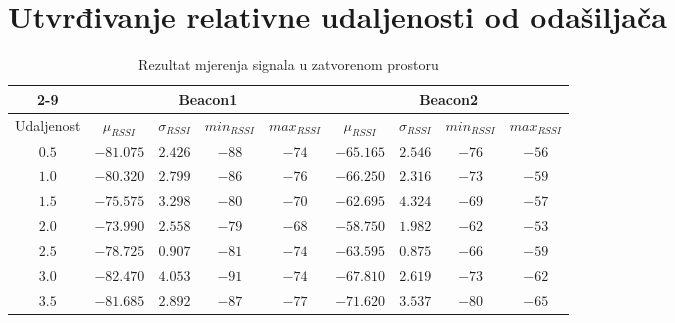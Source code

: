 \section*{Utvrđivanje relativne udaljenosti od odašiljača}

\begin{table}[H]
    \centering
    \caption{Rezultat mjerenja signala u zatvorenom prostoru}
    \label{tbl:indoor}
	\begin{tabular}{|c|cccc||cccc|}%
	\cline{2-9}
	\multicolumn{1}{!{\vrule width 0pt}c!{\vrule width 1pt}}{} & \multicolumn{4}{c||}{Beacon1} & \multicolumn{4}{c|}{Beacon2} \\ %
	\hline 
	Udaljenost & $\mu_{RSSI}$ & $\sigma_{RSSI}$ & $min_{RSSI}$ & $max_{RSSI}$ & $\mu_{RSSI}$ & $\sigma_{RSSI}$ & $min_{RSSI}$ & $max_{RSSI}$ \\ %
	\hline 
	$0.5$ & $-81.075$ & $2.426$ & $-88$ & $-74$ & $-65.165$ & $2.546$ & $-76$ & $-56$ \\ %
	$1.0$ & $-80.320$ & $2.799$ & $-86$ & $-76$ & $-66.250$ & $2.316$ & $-73$ & $-59$ \\ %
	$1.5$ & $-75.575$ & $3.298$ & $-80$ & $-70$ & $-62.695$ & $4.324$ & $-69$ & $-57$ \\ %
	$2.0$ & $-73.990$ & $2.558$ & $-79$ & $-68$ & $-58.750$ & $1.982$ & $-62$ & $-53$ \\ %
	$2.5$ & $-78.725$ & $0.907$ & $-81$ & $-74$ & $-63.595$ & $0.875$ & $-66$ & $-59$ \\ %
	$3.0$ & $-82.470$ & $4.053$ & $-91$ & $-74$ & $-67.810$ & $2.619$ & $-73$ & $-62$ \\ %
	$3.5$ & $-81.685$ & $2.892$ & $-87$ & $-77$ & $-71.620$ & $3.537$ & $-80$ & $-65$ \\ %

\end{tabular}
\end{table}
